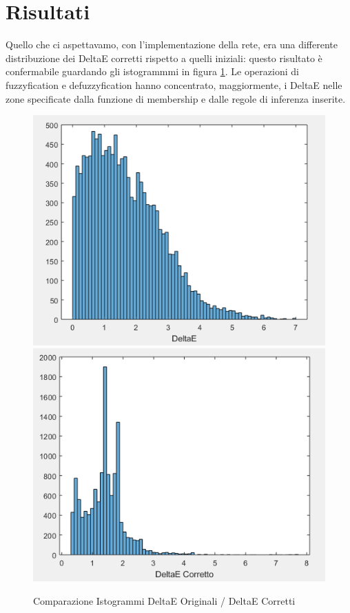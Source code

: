 \section{Risultati}
Quello che ci aspettavamo, con l'implementazione della rete, era una differente distribuzione dei DeltaE corretti rispetto a quelli iniziali: questo risultato è confermabile guardando gli istogrammmi in figura \ref{fig:fuzzyhistogramcomparision}. Le operazioni di fuzzyfication e defuzzyfication hanno concentrato, maggiormente, i DeltaE nelle zone specificate dalla funzione di membership e dalle regole di inferenza inserite.
\begin{figure}[!ht]
\begin{center}
	\includegraphics[scale=0.545]{images/fuzzy-istogramma1.PNG}
	\includegraphics[scale=0.545]{images/fuzzy-istogramma2.PNG}
\end{center}
\caption{Comparazione Istogrammi DeltaE Originali / DeltaE Corretti}
\label{fig:fuzzyhistogramcomparision}
\end{figure}

